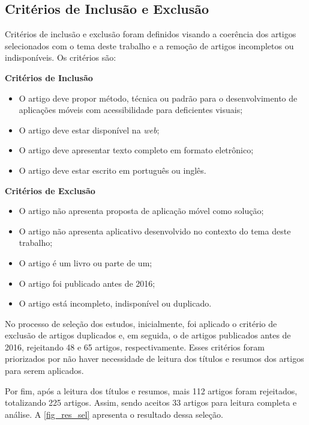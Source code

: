\subsection{Critérios de Inclusão e Exclusão}

Critérios de inclusão e exclusão foram definidos visando a coerência dos artigos selecionados com o tema deste trabalho e a remoção de artigos incompletos ou indisponíveis.
Os critérios são:

\textbf{Critérios de Inclusão}
\begin{itemize}
  \item O artigo deve propor método, técnica ou padrão para o desenvolvimento de aplicações móveis com acessibilidade para deficientes visuais;
  \item O artigo deve estar disponível na \emph{web};
  \item O artigo deve apresentar texto completo em formato eletrônico;
  \item O artigo deve estar escrito em português ou inglês.
\end{itemize}

\textbf{Critérios de Exclusão}
\begin{itemize}
  \item O artigo não apresenta proposta de aplicação móvel como solução;
  \item O artigo não apresenta aplicativo desenvolvido no contexto do tema deste trabalho;
  \item O artigo é um livro ou parte de um;
  \item O artigo foi publicado antes de 2016;
  \item O artigo está incompleto, indisponível ou duplicado.
\end{itemize}

No processo de seleção dos estudos, inicialmente, foi aplicado o critério de exclusão de artigos duplicados e, em seguida, o de artigos
publicados antes de 2016, rejeitando 48 e 65 artigos, respectivamente.
Esses critérios foram priorizados por não haver necessidade de leitura dos títulos e resumos dos artigos para serem aplicados.

Por fim, após a leitura dos títulos e resumos, mais 112 artigos foram rejeitados, totalizando 225 artigos.
Assim, sendo aceitos 33 artigos para leitura completa e análise.
A \autoref{fig_res_sel} apresenta o resultado dessa seleção.

